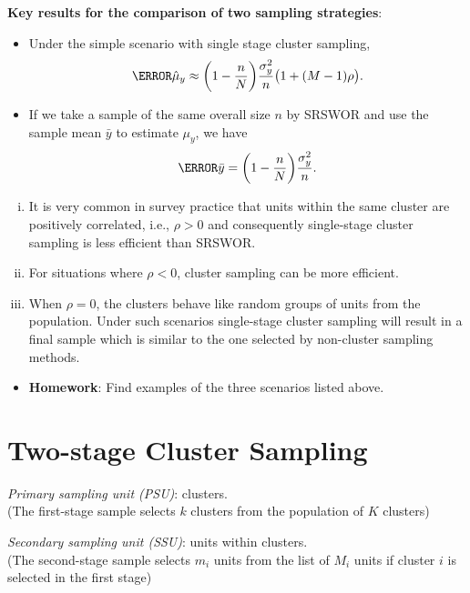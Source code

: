 \textbf{Key results for the comparison of two sampling strategies}:
\begin{itemize}
      \item Under the simple scenario with single stage cluster sampling,
            \[ \V{\hat{\mu}_y}\approx \biggl(1-\frac{n}{N}\biggr)\frac{\sigma_y^2}{n}\bigl(1+(M-1)\rho\bigr). \]
      \item If we take a sample of the same overall size $ n $ by SRSWOR and use the sample mean $ \bar{y} $
            to estimate $ \mu_y $, we have
            \[ \V{\bar{y}}=\biggl(1-\frac{n}{N}\biggr)\frac{\sigma_y^2}{n}. \]
\end{itemize}
\begin{enumerate}[(i)]
      \item It is very common in survey practice that units within the same
            cluster are positively correlated, i.e., $ \rho>0 $ and consequently
            single-stage cluster sampling is less efficient than SRSWOR\@.
      \item For situations where $ \rho<0 $, cluster sampling can be more
            efficient.
      \item When $\rho = 0$, the clusters behave like random groups of units
            from the population. Under such scenarios single-stage cluster
            sampling will result in a final sample which is similar to the one
            selected by non-cluster sampling methods.
\end{enumerate}
\begin{itemize}
      \item \textbf{Homework}: Find examples of the three scenarios listed above.
\end{itemize}
\section{Two-stage Cluster Sampling}

\emph{Primary sampling unit (PSU)}: clusters.\\
(The first-stage sample selects $k$ clusters from the population of $K$
clusters)

\emph{Secondary sampling unit (SSU)}: units within clusters.\\
(The second-stage sample selects $ m_i $ units from the list of $ M_i $ units if
cluster $i$ is selected in the first stage)

